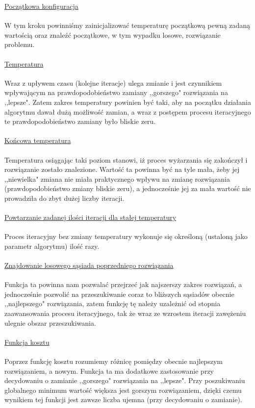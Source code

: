 \documentclass[twoside]{projektInzynierskiMS1}
\newcommand{\newLine}{~\\}
\newcommand{\si}{ś}
\begin{document}
\noindent \underline{Początkowa konfiguracja} \\ \newLine
\indent W tym kroku powinniśmy zainicjalizować temperaturę początkową pewną zadaną wartością oraz znaleźć początkowe, w tym wypadku losowe, rozwiązanie problemu. 
\\ \newLine

\noindent \underline{Temperatura} \\ \newLine
\indent  Wraz z upływem czasu (kolejne iteracje) ulega zmianie i jest czynnikiem wpływającym na prawdopodobieństwo zamiany ,,gorszego" rozwiązania na ,,lepsze". Zatem zakres temperatury powinien być taki, aby na początku działania algorytmu dawał dużą możliwość zamian, a wraz z postępem procesu iteracyjnego te prawdopodobieństwo zamiany było bliskie zeru.\\ \newLine

\noindent \underline{Końcowa temperatura} \\ \newLine
\indent Temperatura osiągając taki poziom stanowi, iż proces wyżarzania się zakończył i rozwiązanie zostało znalezione.
Wartość ta powinna być na tyle mała, żeby jej ,,niewielka" zmiana nie miała praktycznego wpływu na zmianę rozwiązania (prawdopodobieństwo zmiany bliskie zeru), a jednocze\si nie jej za mała warto\si ć nie prowadziła do zbyt dużej liczby iteracji. \\ \newLine

\noindent \underline{Powtarzanie zadanej ilo\si ci iteracji dla stałej temperatury} \\ \newLine
Proces iteracyjny bez zmiany temperatury wykonuje się okre\si loną (ustaloną jako parametr algorytmu) ilo\si ć razy. \\ \newLine

\noindent \underline{Znajdowanie losowego sąsiada poprzedniego rozwiązania} \\ \newLine
\indent Funkcja ta powinna nam pozwalać przejrzeć jak najszerszy zakres rozwiązań, a jednocze\si nie pozwolić na przeszukiwanie coraz to bliższych sąsiadów obecnie ,,najlepszego" rozwiązania, zatem funkcję tę należy uzależnić od stopnia zaawansowania procesu iteracyjnego, tak że wraz ze wzrostem iteracji zawężeniu ulegnie obszar przeszukiwania.\\ \newLine

\noindent \underline{Funkcja kosztu} \\ \newLine
\indent Poprzez funkcję kosztu rozumiemy różnicę pomiędzy obecnie najlepszym rozwiązaniem, a nowym. Funkcja ta ma dodatkowe zastosowanie przy decydowaniu o zamianie ,,gorszego" rozwiązania na ,,lepsze". Przy poszukiwaniu globalnego minimum warto\si ć większa jest gorszym rozwiązaniem, dzięki czemu wynikiem tej funkcji jest zawsze liczba ujemna (przy decydowaniu o zamianie). \\ \newLine
\end{document}
